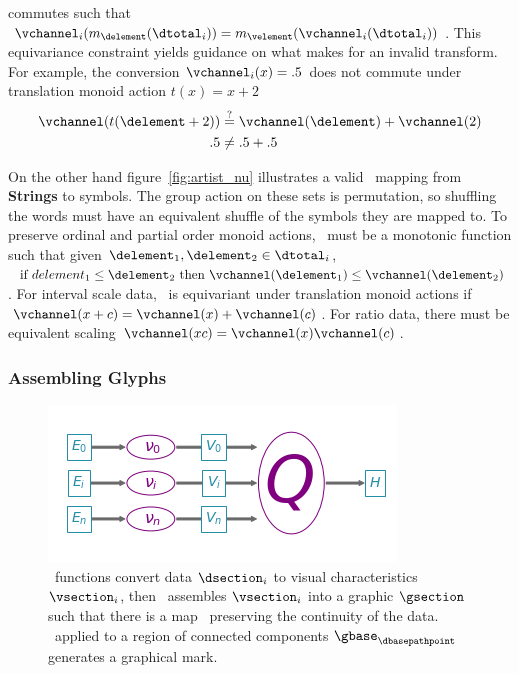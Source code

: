 \documentclass[../main.tex]{subfiles}
\begin{document}
commutes such that $\vchannel_i(m_{\delement}(\dtotal_i)) = m_{\velement}(\vchannel_i(\dtotal_i))$. This equivariance constraint yields guidance on what makes for an invalid transform. For example, the conversion $\vchannel_{i}(x) = .5$ does not commute under translation monoid action $t(x) = x+2$  
\begin{align}
    \vchannel(t(\delement + 2)) & \overset{?}{=} \vchannel(\delement) + \vchannel(2)\\
    .5 &\neq .5 + .5
\end{align}

On the other hand figure~\ref{fig:artist_nu} illustrates a valid \vchannel\ mapping from \textbf{Strings} to symbols. The group action on these sets is permutation, so shuffling the words must have an equivalent shuffle of the symbols they are mapped to. To preserve ordinal and partial order monoid actions, \vchannel\ must be a monotonic function such that given $\delement_1, \delement_2 \in \dtotal_{i}$, $\text{ if } delement_1 \leq \delement_2 \text{ then } \vchannel (\delement_1) \leq \vchannel(\delement_2)$. For interval scale data, \vchannel\ is equivariant under translation monoid actions if $\vchannel (x + c) = \vchannel(x) + \vchannel(c)$. For ratio data, there must be equivalent scaling $ \vchannel(xc) = \vchannel(x)\vchannel(c)$.

\subsubsection{Assembling Glyphs \vmark}
\label{sec:artist_q}
\begin{figure}[H]
    \includegraphics[width=\textwidth]{figures/math/path_of_q}
    \caption{\vchannel\ functions convert data $\dsection_i$ to visual characteristics $\vsection_i$, then \vmark\ assembles $\vsection_i$ into a graphic $\gsection$ such that there is a map \vindex\ preserving the continuity of the data. \gsection\ applied to a region of connected components $\gbase_{\dbasepathpoint}$  generates a graphical mark.} 
    \label{fig:artist_q}
\end{figure}
\end{document}
